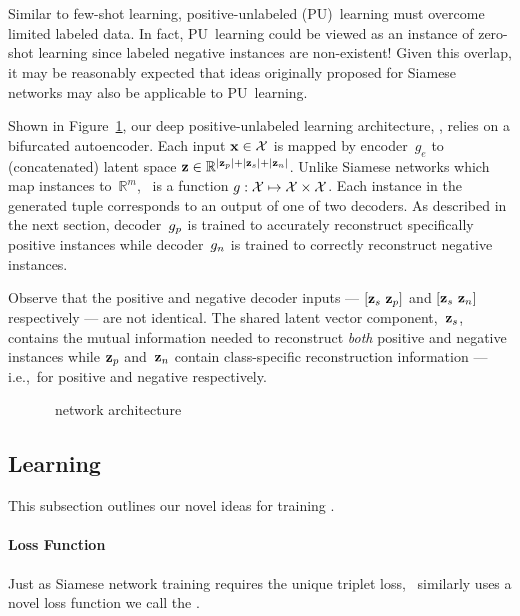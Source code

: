 \section{\toolname}\label{sec:Toolname}

Similar to few-shot learning, positive-unlabeled (PU)~learning must overcome limited labeled data.  In fact, PU~learning could be viewed as an instance of zero-shot learning since labeled negative instances are non-existent!  Given this overlap, it may be reasonably expected that ideas originally proposed for Siamese networks may also be applicable to PU~learning.

Shown in Figure~\ref{fig:Toolname}, our deep positive-unlabeled learning architecture, \textit{\toolname}, relies on a bifurcated autoencoder.  Each input ${\mathbf{x}\in\mathcal{X}}$ is mapped by encoder~$g_e$ to (concatenated) latent space ${\mathbf{z}\in\mathbb{R}^{\lvert\mathbf{z}_{p}\rvert+\lvert\mathbf{z}_{s}\rvert+\lvert\mathbf{z}_{n}\rvert}}$. Unlike Siamese networks which map instances to~$\mathbb{R}^m$, \toolname\ is a function ${g:\mathcal{X}\mapsto\mathcal{X}\times\mathcal{X}}$.  Each instance in the generated tuple corresponds to an output of one of two decoders.  As described in the next section, decoder~$g_{p}$ is trained to accurately reconstruct specifically positive instances while decoder~$g_{n}$ is trained to correctly reconstruct negative instances.

Observe that the positive and negative decoder inputs --- ${\lbrack \mathbf{z}_{s}~\mathbf{z}_{p} \rbrack}$ and ${\lbrack \mathbf{z}_{s}~\mathbf{z}_{n} \rbrack}$ respectively --- are not identical.  The shared latent vector component,~$\mathbf{z}_{s}$, contains the mutual information needed to reconstruct \textit{both} positive and negative instances while $\mathbf{z}_{p}$ and~$\mathbf{z}_{n}$ contain class-specific reconstruction information --- i.e.,~for positive and negative respectively.

\begin{figure}[t]
  \centering
  
  \caption{\toolname\ network architecture}\label{fig:Toolname}
\end{figure}

\subsection{Learning}

This subsection outlines our novel ideas for training \toolname\@.

\paragraph{Loss Function} Just as Siamese network training requires the unique triplet loss, \toolname\ similarly uses a novel loss function we call the \textit{\attLossLow}.

